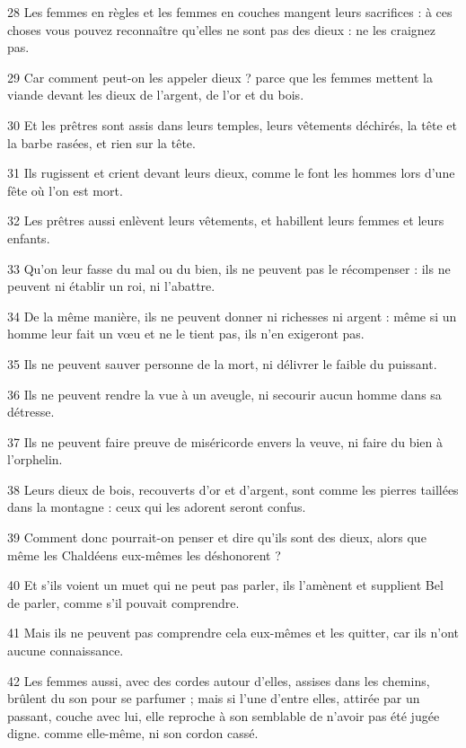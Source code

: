 \par 28 Les femmes en règles et les femmes en couches mangent leurs sacrifices : à ces choses vous pouvez reconnaître qu'elles ne sont pas des dieux : ne les craignez pas.
\par 29 Car comment peut-on les appeler dieux ? parce que les femmes mettent la viande devant les dieux de l'argent, de l'or et du bois.
\par 30 Et les prêtres sont assis dans leurs temples, leurs vêtements déchirés, la tête et la barbe rasées, et rien sur la tête.
\par 31 Ils rugissent et crient devant leurs dieux, comme le font les hommes lors d'une fête où l'on est mort.
\par 32 Les prêtres aussi enlèvent leurs vêtements, et habillent leurs femmes et leurs enfants.
\par 33 Qu'on leur fasse du mal ou du bien, ils ne peuvent pas le récompenser : ils ne peuvent ni établir un roi, ni l'abattre.
\par 34 De la même manière, ils ne peuvent donner ni richesses ni argent : même si un homme leur fait un vœu et ne le tient pas, ils n'en exigeront pas.
\par 35 Ils ne peuvent sauver personne de la mort, ni délivrer le faible du puissant.
\par 36 Ils ne peuvent rendre la vue à un aveugle, ni secourir aucun homme dans sa détresse.
\par 37 Ils ne peuvent faire preuve de miséricorde envers la veuve, ni faire du bien à l'orphelin.
\par 38 Leurs dieux de bois, recouverts d'or et d'argent, sont comme les pierres taillées dans la montagne : ceux qui les adorent seront confus.
\par 39 Comment donc pourrait-on penser et dire qu'ils sont des dieux, alors que même les Chaldéens eux-mêmes les déshonorent ?
\par 40 Et s'ils voient un muet qui ne peut pas parler, ils l'amènent et supplient Bel de parler, comme s'il pouvait comprendre.
\par 41 Mais ils ne peuvent pas comprendre cela eux-mêmes et les quitter, car ils n'ont aucune connaissance.
\par 42 Les femmes aussi, avec des cordes autour d'elles, assises dans les chemins, brûlent du son pour se parfumer ; mais si l'une d'entre elles, attirée par un passant, couche avec lui, elle reproche à son semblable de n'avoir pas été jugée digne. comme elle-même, ni son cordon cassé.
